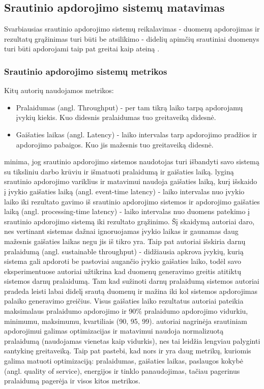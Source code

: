 \documentclass{VUMIFPSbakalaurinis}
\begin{document}
\subsection{Srautinio apdorojimo sistemų matavimas}
Svarbiausias srautinio apdorojimo sistemų reikalavimas - duomenų apdorojimas ir rezultatų grąžinimas turi būti be atsilikimo - didelių apimčių srautiniai duomenys turi būti apdorojami taip pat greitai kaip ateiną \cite{stonebraker20058}. 

\subsubsection{Srautinio apdorojimo sistemų metrikos}
Kitų autorių naudojamos metrikos:
\begin{itemize}
    \item Pralaidumas (angl. Throughput) - per tam tikrą laiko tarpą apdorojamų įvykių kiekis. Kuo didesnis pralaidumas tuo greitaveiką didesnė. 
    \item Gaišaties laikas (angl. Latency) - laiko intervalas tarp apdorojimo pradžios ir apdorojimo pabaigos. Kuo jis mažesnis tuo greitaveiką didesnė.
\end{itemize}

\cite{stonebraker20058} minima, jog srautinio apdorojimo sistemos naudotojas turi išbandyti savo sistemą su tiksliniu darbo krūviu ir išmatuoti pralaidumą ir gaišaties laiką. \cite{Karimov2018BenchmarkingDS} lyginą srautinio apdorojimo variklius ir matavimui naudoja gaišaties laiką, kurį išskaido į įvykio gaišaties laiką (angl. event-time latency) - laiko intervalas nuo įvykio laiko iki rezultato gavimo iš srautinio apdorojimo sistemos ir apdorojimo gaišaties laiką (angl. processing-time latency) - laiko intervalas nuo duomens patekimo į srautinio apdorojimo sistemą iki rezultato grąžinimo. Šį skaidymą autoriai daro, nes vertinant sistemas dažnai ignoruojamas įvykio laikas ir gaunamas daug mažesnis gaišaties laikas negu jis iš tikro yra. Taip pat autoriai išskiria darnų pralaidumą (angl. sustainable throughput) - didžiausia apkrova įvykių, kurią sistema gali apdoroti be pastoviai augančio įvykio gaišaties laiko, todėl savo eksperimentuose autoriai užtikrina kad duomenų generavimo greitis atitiktų sistemos darnų pralaidumą. Tam kad sužinoti darnų pralaidumą sistemos autoriai pradeda leisti labai didelį srautą duomenų ir mažina iki kol sistemos apdorojimas palaiko generavimo greičius. Visus gaišaties laiko rezultatus autoriai pateikia maksimalaus pralaidumo apdorojimo ir 90\% pralaidumo apdorojimo vidurkiu, minimumu, maksimumu, kvartiliais (90, 95, 99). \cite{hirzel2014catalog} autoriai nagrinėja srautiniam apdorojimui galimas optimizacijas ir matavimui naudoja normalizuotą pralaidumą (naudojamas vienetas kaip vidurkis), nes tai leidžia lengviau palyginti santykinę greitaveiką. Taip pat \cite{hirzel2014catalog} pastebi, kad nors ir yra daug metrikų, kuriomis galima matuoti optimizaciją: pralaidumas, gaišaties laikas, paslaugos kokybė (angl. quality of service), energijos ir tinklo panaudojimas, tačiau pagerinus pralaidumą pagerėja ir visos kitos metrikos.
\end{document}
